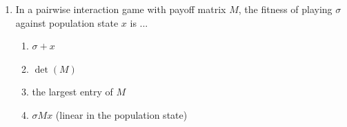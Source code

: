 \documentclass[11pt]{article}
\begin{document}
\begin{enumerate}[itemsep=6pt]
\begin{enumerate}
    \item a finite population of fixed size
    \item a zero-sum game only
    \item a single population playing itself
  \end{enumerate}
  \item In a pairwise interaction game with payoff matrix \(M\), the fitness of playing \(\sigma\) against population state \(x\) is ...
  \begin{enumerate}
    \item \(\sigma + x\)
    \item \(\det(M)\)
    \item the largest entry of \(M\)
    \item \(\sigma M x\) (linear in the population state)
  \end{enumerate}
\end{enumerate}
\end{document}
